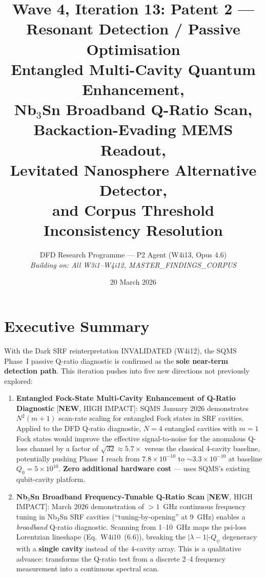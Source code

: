 \documentclass[11pt]{article}
\title{Wave 4, Iteration 13: Patent 2 --- Resonant Detection / Passive Optimisation\\
\large Entangled Multi-Cavity Quantum Enhancement,\\
Nb$_3$Sn Broadband Q-Ratio Scan,\\
Backaction-Evading MEMS Readout,\\
Levitated Nanosphere Alternative Detector,\\
and Corpus Threshold Inconsistency Resolution}
\author{DFD Research Programme --- P2 Agent (W4i13, Opus 4.6)\\
\textit{Building on: All W3i1--W4i12, MASTER\_FINDINGS\_CORPUS}}
\date{20 March 2026}
\newcommand{\lam}{\lambda}
\newcommand{\ee}[1]{\times 10^{#1}}
\newcommand{\Qpsi}{Q_\psi}
\newcommand{\lbone}{|\lam - 1|}
\theoremstyle{definition}
\theoremstyle{remark}
\begin{document}
\maketitle
\tableofcontents
\newpage

\section*{Executive Summary}

\begin{tcolorbox}[colback=blue!5!white, colframe=blue!60!black,
  title=\textbf{W4i13 --- P2 PASSIVE DETECTION: TOP 5 FINDINGS}]

With the Dark SRF reinterpretation INVALIDATED (W4i12), the SQMS Phase~I
passive Q-ratio diagnostic is confirmed as the \textbf{sole near-term
detection path}. This iteration pushes into five new directions not
previously explored:

\begin{enumerate}[nosep]
\item \textbf{Entangled Fock-State Multi-Cavity Enhancement of
  Q-Ratio Diagnostic} [\textbf{NEW}, HIGH IMPACT]:
  SQMS January 2026 demonstrates $N^2(m+1)$ scan-rate scaling for
  entangled Fock states in SRF cavities. Applied to the DFD Q-ratio
  diagnostic, $N=4$ entangled cavities with $m=1$ Fock states would
  improve the effective signal-to-noise for the anomalous Q-loss
  channel by a factor of $\sqrt{32} \approx 5.7\times$ versus the
  classical 4-cavity baseline, potentially pushing Phase~I reach from
  $7.8\ee{-10}$ to $\sim 3.3\ee{-10}$ at baseline $Q_0 = 5\ee{10}$.
  \textbf{Zero additional hardware cost} --- uses SQMS's existing
  qubit-cavity platform.

\item \textbf{Nb$_3$Sn Broadband Frequency-Tunable Q-Ratio Scan}
  [\textbf{NEW}, HIGH IMPACT]:
  March 2026 demonstration of $>1$~GHz continuous frequency tuning
  in Nb$_3$Sn SRF cavities (``tuning-by-opening'' at 9~GHz) enables
  a \emph{broadband} Q-ratio diagnostic. Scanning from 1--10~GHz maps
  the psi-loss Lorentzian lineshape (Eq.~W4i10~(6.6)), breaking the
  $\lbone$-$\Qpsi$ degeneracy with a \textbf{single cavity} instead
  of the 4-cavity array. This is a qualitative advance: transforms
  the Q-ratio test from a discrete 2--4 frequency measurement into a
  continuous spectral scan.


\end{enumerate}
\end{tcolorbox}
\end{document}
